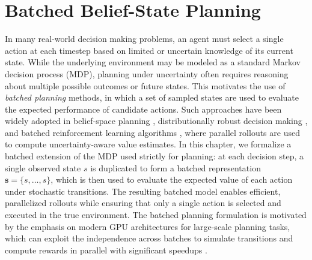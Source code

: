\chapter{Batched Belief-State Planning}\label{ch:bbmdp}

In many real-world decision making problems, an agent must select a single action at each timestep based on limited or uncertain knowledge of its current state.
While the underlying environment may be modeled as a standard Markov decision process (MDP), planning under uncertainty often requires reasoning about multiple possible outcomes or future states.
This motivates the use of \textit{batched planning} methods, in which a set of sampled states are used to evaluate the expected performance of candidate actions.
Such approaches have been widely adopted in belief-space planning \cite{kaelbling1998planning,pineau2003point}, distributionally robust decision making \cite{nilim2005robust,iyengar2005robust}, and batched reinforcement learning algorithms \cite{osband2016deep,lee2021sunrise}, where parallel rollouts are used to compute uncertainty-aware value estimates.
In this chapter, we formalize a batched extension of the MDP used strictly for planning: at each decision step, a single observed state $s$ is duplicated to form a batched representation $\mathbf{s} = \{s, \ldots, s\}$, which is then used to evaluate the expected value of each action under stochastic transitions.
The resulting batched model enables efficient, parallelized rollouts while ensuring that only a single action is selected and executed in the true environment.
The batched planning formulation is motivated by the emphasis on modern GPU architectures for large-scale planning tasks, which can exploit the independence across batches to simulate transitions and compute rewards in parallel with significant speedups \cite{steinkraus2005using}.

